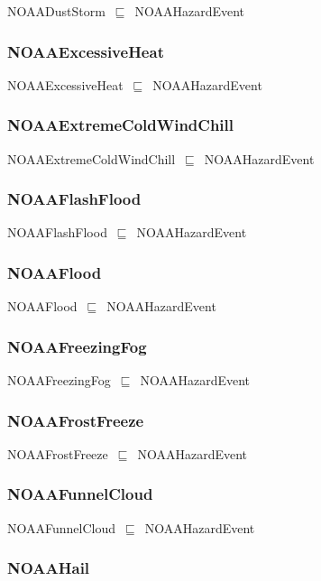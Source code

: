 \documentclass{article}
\begin{document}
NOAADustStorm~\ensuremath{\sqsubseteq}~NOAAHazardEvent~

\subsubsection*{NOAAExcessiveHeat}

NOAAExcessiveHeat~\ensuremath{\sqsubseteq}~NOAAHazardEvent~

\subsubsection*{NOAAExtremeColdWindChill}

NOAAExtremeColdWindChill~\ensuremath{\sqsubseteq}~NOAAHazardEvent~

\subsubsection*{NOAAFlashFlood}

NOAAFlashFlood~\ensuremath{\sqsubseteq}~NOAAHazardEvent~

\subsubsection*{NOAAFlood}

NOAAFlood~\ensuremath{\sqsubseteq}~NOAAHazardEvent~

\subsubsection*{NOAAFreezingFog}

NOAAFreezingFog~\ensuremath{\sqsubseteq}~NOAAHazardEvent~

\subsubsection*{NOAAFrostFreeze}

NOAAFrostFreeze~\ensuremath{\sqsubseteq}~NOAAHazardEvent~

\subsubsection*{NOAAFunnelCloud}

NOAAFunnelCloud~\ensuremath{\sqsubseteq}~NOAAHazardEvent~

\subsubsection*{NOAAHail}
\end{document}
